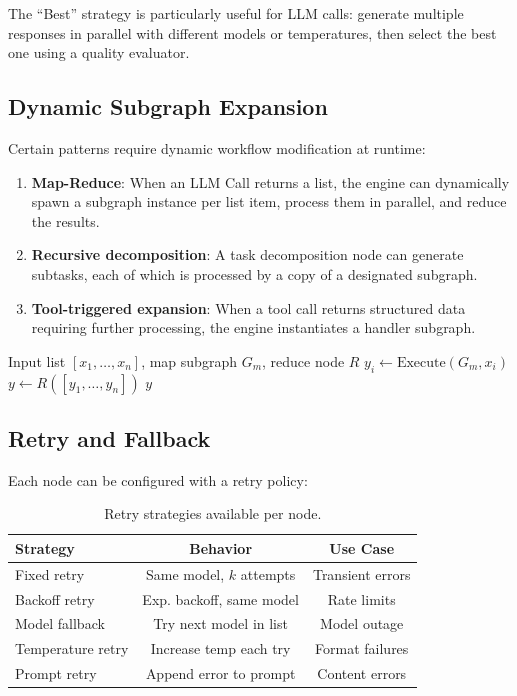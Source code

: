 The ``Best'' strategy is particularly useful for LLM calls: generate multiple responses in parallel with different models or temperatures, then select the best one using a quality evaluator.

\subsection{Dynamic Subgraph Expansion}

Certain patterns require dynamic workflow modification at runtime:

\begin{enumerate}[leftmargin=1.4em]
    \item \textbf{Map-Reduce}: When an LLM Call returns a list, the engine can dynamically spawn a subgraph instance per list item, process them in parallel, and reduce the results.
    \item \textbf{Recursive decomposition}: A task decomposition node can generate subtasks, each of which is processed by a copy of a designated subgraph.
    \item \textbf{Tool-triggered expansion}: When a tool call returns structured data requiring further processing, the engine instantiates a handler subgraph.
\end{enumerate}

\begin{algorithm}[H]
\caption{Map-Reduce Expansion}
\label{alg:mapreduce}
\begin{algorithmic}[1]
\Require Input list $[x_1, \ldots, x_n]$, map subgraph $G_m$, reduce node $R$
\State {}
    \State $y_i \gets \text{Execute}(G_m, x_i)$
\EndFor
\State {}
\State $y \gets R([y_1, \ldots, y_n])$
\State \Return $y$
\end{algorithmic}
\end{algorithm}

\subsection{Retry and Fallback}

Each node can be configured with a retry policy:

\begin{table}[H]
\centering
\small
\begin{tabular}{lcc}
\toprule
\textbf{Strategy} & \textbf{Behavior} & \textbf{Use Case} \\
\midrule
Fixed retry & Same model, $k$ attempts & Transient errors \\
Backoff retry & Exp. backoff, same model & Rate limits \\
Model fallback & Try next model in list & Model outage \\
Temperature retry & Increase temp each try & Format failures \\
Prompt retry & Append error to prompt & Content errors \\
\bottomrule
\end{tabular}
\caption{Retry strategies available per node.}
\label{tab:retry}
\end{table}

